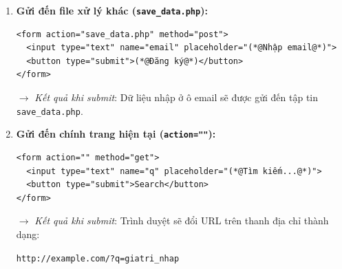 \documentclass[11pt,oneside]{book}
\newcommand{\codeinline}[1]{\textcolor{accentOrange}{\texttt{#1}}}
\begin{document}
\begin{enumerate}[leftmargin=1.5em, itemsep=6pt, parsep=0pt]
    \item \textbf{Gửi đến file xử lý khác (\codeinline{save\_data.php}):}
    
\begin{codeWindow}
\begin{lstlisting}[language=HTML5]
<form action="save_data.php" method="post">
  <input type="text" name="email" placeholder="(*@Nhập email@*)">
  <button type="submit">(*@Đăng ký@*)</button>
</form>
\end{lstlisting}
\end{codeWindow}

\begin{browserWindow}
\sffamily\small
{} \;\;
\end{browserWindow}

\textbf{$\rightarrow$} \textit{Kết quả khi submit}: Dữ liệu nhập ở ô email sẽ được gửi đến tập tin \codeinline{save\_data.php}.

    \item \textbf{Gửi đến chính trang hiện tại (\codeinline{action=""}):}

\begin{codeWindow}
\begin{lstlisting}[language=HTML5]
<form action="" method="get">
  <input type="text" name="q" placeholder="(*@Tìm kiếm...@*)">
  <button type="submit">Search</button>
</form>
\end{lstlisting}
\end{codeWindow}

\begin{browserWindow}
\sffamily\small
{} \;\;
\end{browserWindow}

\textbf{$\rightarrow$} \textit{Kết quả khi submit}: Trình duyệt sẽ đổi URL trên thanh địa chỉ thành dạng:
\begin{center}
\codeinline{http://example.com/?q=giatri\_nhap}
\end{center}
\end{enumerate}
\end{document}
